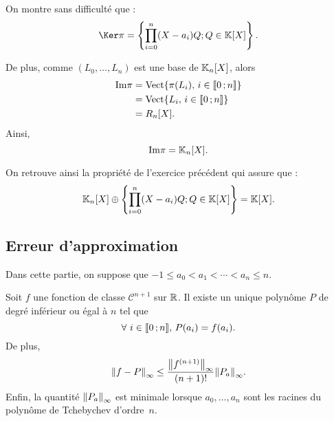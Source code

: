 \begin{remarque}
On montre sans difficulté que :
\[
\Ker \pi = \left\{ \prod_{i=0}^n (X - a_i) Q ; Q \in \K[X] \right\}.
\]

De plus, comme $(L_0,\ldots,L_n)$ est une base de $\mathbb{K}_n[X]$, alors
\begin{align*}
\mathrm{Im} \pi &= \mathrm{Vect}\{\pi(L_i),\, i \in \llbracket 0\,; n \rrbracket\} \\
&= \mathrm{Vect}\{L_i,\, i \in \llbracket 0\,; n \rrbracket\} \\
&= R_n[X].
\end{align*}
Ainsi,
\[
\mathrm{Im} \pi = \mathbb{K}_n[X].
\]

On retrouve ainsi la propriété de l'exercice précédent qui assure que :
\[
\mathbb{K}_n[X] \oplus \left\{ \prod_{i=0}^n (X - a_i) Q ; Q \in \mathbb{K}[X] \right\} = \mathbb{K}[X].
\]
\end{remarque}

\subsection{Erreur d'approximation}

Dans cette partie, on suppose que $-1 \leq a_0 < a_1 < \cdots < a_n \leq n$.

\begin{theo}
Soit $f$ une fonction de classe $\mathscr{C}^{n+1}$ sur $\mathbb{R}$. Il existe un unique polynôme $P$ de degré inférieur ou égal à $n$ tel que
\[
\forall\, i \in \interent{0}{n},\, P(a_i) = f(a_i).
\]
De plus,
\[
\norm{f - P}_{\infty} \leq \frac{\norm{f^{(n+1)}}_{\infty}}{(n+1)!} \norm{P_a}_\infty.
\]
Enfin, la quantité $\norm{P_a}_\infty$ est minimale lorsque $a_0,\ldots,a_n$ sont les racines du polynôme de Tchebychev d'ordre~$n$.
\end{theo}




